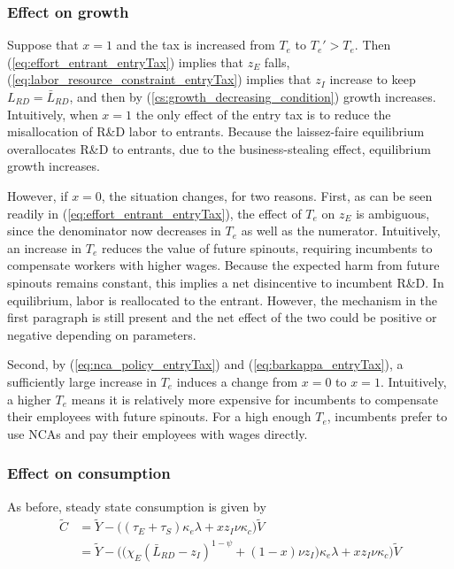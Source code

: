 \documentclass[11pt,english]{article}
\theoremstyle{remark}
\begin{document}
\subsubsection{Effect on growth}

Suppose that $x = 1$ and the tax is increased from $T_e$ to $T_e' > T_e$. Then (\ref{eq:effort_entrant_entryTax}) implies that $z_E$ falls, (\ref{eq:labor_resource_constraint_entryTax}) implies that $z_I$ increase to keep $L_{RD} = \bar{L}_{RD}$, and then by (\ref{cs:growth_decreasing_condition}) growth increases. Intuitively, when $x = 1$ the only effect of the entry tax is to reduce the misallocation of R\&D labor to entrants. Because the laissez-faire equilibrium overallocates R\&D to entrants, due to the business-stealing effect, equilibrium growth increases.

However, if $x = 0$, the situation changes, for two reasons. First, as can be seen readily in (\ref{eq:effort_entrant_entryTax}), the effect of $T_e$ on $z_E$ is ambiguous, since the denominator now decreases in $T_e$ as well as the numerator. Intuitively, an increase in $T_e$ reduces the value of future spinouts, requiring incumbents to compensate workers with higher wages. Because the expected harm from future spinouts remains constant, this implies a net disincentive to incumbent R\&D. In equilibrium, labor is reallocated to the entrant. However, the mechanism in the first paragraph is still present and the net effect of the two could be positive or negative depending on parameters.

Second, by (\ref{eq:nca_policy_entryTax}) and (\ref{eq:barkappa_entryTax}), a sufficiently large increase in $T_e$ induces a change from $x = 0$ to $x = 1$. Intuitively, a higher $T_e$ means it is relatively more expensive for incumbents to compensate their employees with future spinouts. For a high enough $T_e$, incumbents prefer to use NCAs and pay their employees with wages directly.

\subsubsection{Effect on consumption}

As before, steady state consumption is given by
\begin{align}
\tilde{C} &= \tilde{Y} - \Big( (\tau_E  + \tau_S)\kappa_e \lambda + x z_I \nu \kappa_c \Big) \tilde{V} \\
&= \tilde{Y} - \Big( \big( \chi_E (\bar{L}_{RD} - z_I)^{1-\psi} + (1-x) \nu z_I \big) \kappa_e \lambda + x z_I \nu \kappa_c \Big) \tilde{V}  \label{cs:scen3:consumption_eq}
\end{align}
\end{document}
